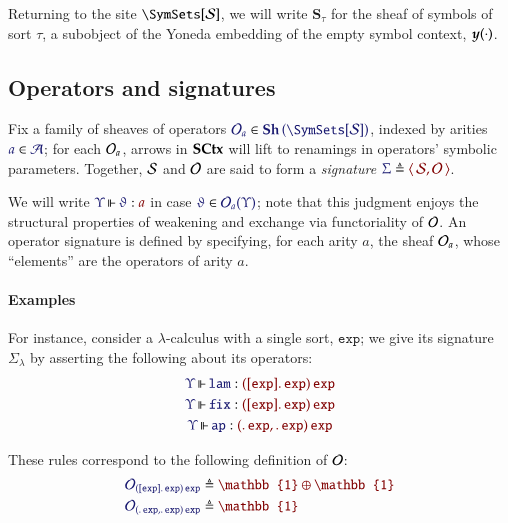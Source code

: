 \documentclass[11pt]{article}
\theoremstyle{definition}
\theoremstyle{remark}
\numberwithin{equation}{section}
\newcommand\SortExp{\mathtt{exp}}
\newcommand\Sheaves[1]{\mathbf{Sh}\left(#1\right)}
\newcommand\SCtxSite{\SymSets[\Sorts]}
\begin{document}
Returning to the site $\SCtxSite$, we will write $\mathbf{S}_\tau$ for the sheaf
of symbols of sort $\tau$, a subobject of the Yoneda embedding of the empty
symbol context, $\boldsymbol{y} (\cdot)$.

\subsection{Operators and signatures}

Fix a family of sheaves of operators
$\Member{\Operators_a}{\Sheaves{\SCtxSite}}$, indexed by arities
$\Member{a}{\Arities}$; for each $\mathcal{O}_a$, arrows in $\mathbf{SCtx}$ will lift to
renamings in operators' symbolic parameters. Together, $\mathcal{S}$ and $\mathcal{O}$ are said to form a \emph{signature}
$\Define{\Sigma}{\Pair{\Sorts}{\Operators}}$.

We will write $\IsOperator{\Upsilon}{\vartheta}{a}$ in case
$\Member{\vartheta}{\Operators_a(\Upsilon)}$; note that this judgment enjoys
the structural properties of weakening and exchange via functoriality of
$\mathcal{O}$. An operator signature is defined by specifying, for each arity
$a$, the sheaf $\mathcal{O}_a$, whose ``elements'' are the operators of arity
$a$.


\paragraph{Examples}

For instance, consider a $\lambda$-calculus with a single sort, $\SortExp$; we
give its signature $\Sigma_{\lambda}$ by asserting the following about its
operators:
\begin{gather*}
  \IsOperator{\Upsilon}{\mathtt{lam}}{
    \MkArity{
      \MkValence{}{\SortExp}{\SortExp}
    }{\SortExp}
  }\\
  \IsOperator{\Upsilon}{\mathtt{fix}}{
    \MkArity{
      \MkValence{}{\SortExp}{\SortExp}
    }{\SortExp}
  }\\
  \IsOperator{\Upsilon}{\mathtt{ap}}{
    \MkArity{
      \MkValence{}{}{\SortExp},
      \MkValence{}{}{\SortExp}
    }{\SortExp}
  }
\end{gather*}

These rules correspond to the following definition of $\mathcal{O}$:
\begin{align*}
  \ADefine{
    \Operators_{
       \MkArity{
        \MkValence{}{\SortExp}{\SortExp}
      }{\SortExp}
    }
  }{
    \mathbb{1}\oplus\mathbb{1}
  }
  \\
  \ADefine{
    \Operators_{
      \MkArity{
        \MkValence{}{}{\SortExp},
        \MkValence{}{}{\SortExp}
      }{\SortExp}
    }
  }{
    \mathbb{1}
  }
\end{align*}
\end{document}

